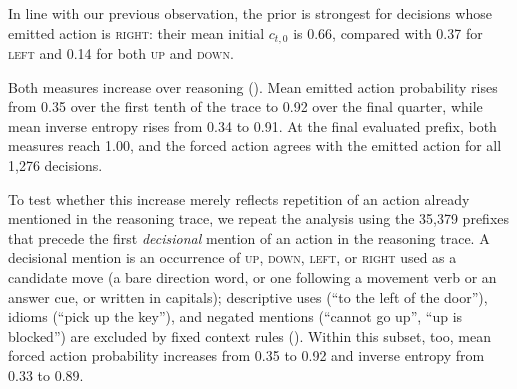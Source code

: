 \documentclass{article}
\begin{document}
In line with our previous observation, the prior is strongest for decisions whose emitted action is \textsc{right}: their mean initial $c_{t,0}$ is 0.66, compared with 0.37 for \textsc{left} and 0.14 for both \textsc{up} and \textsc{down}. 

Both measures increase over reasoning (). 
Mean emitted action probability rises from 0.35 over the first tenth of the trace to 0.92 over the final quarter, while mean inverse entropy rises from 0.34 to 0.91. 
At the final evaluated prefix, both measures reach 1.00, and the forced action agrees with the emitted action for all 1,276 decisions.

To test whether this increase merely reflects repetition of an action already mentioned in the reasoning trace, we repeat the analysis using the 35,379 prefixes that precede the first \emph{decisional} mention of an action in the reasoning trace. 
A decisional mention is an occurrence of \textsc{up}, \textsc{down}, \textsc{left}, or \textsc{right} used as a candidate move (a bare direction word, or one following a movement verb or an answer cue, or written in capitals); descriptive uses (``to the left of the door''), idioms (``pick up the key''), and negated mentions (``cannot go up'', ``up is blocked'') are excluded by fixed context rules ().
Within this subset, too, mean forced action probability increases from 0.35 to 0.92 and inverse entropy from 0.33 to 0.89.

\end{document}
